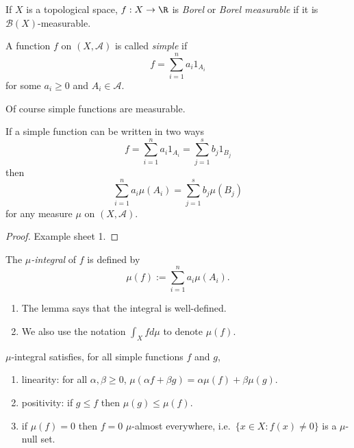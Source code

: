 \documentclass[a4paper]{article}
\begin{document}
\begin{definition}
  If \(X\) is a topological space, \(f: X \to \R\) is \emph{Borel} or \emph{Borel measurable} if it is \(\mathcal B(X)\)-measurable.
\end{definition}

\begin{definition}
  A function \(f\) on \((X, \mathcal A)\) is called \emph{simple} if
  \[
    f = \sum_{i = 1}^n a_i 1_{A_i}
  \]
  for some \(a_i \geq 0\) and \(A_i \in \mathcal A\).
\end{definition}

Of course simple functions are measurable.

\begin{lemma}
  If a simple function can be written in two ways
  \[
    f = \sum_{i = 1}^n a_i 1_{A_i} = \sum_{j = 1}^s b_j 1_{B_j}
  \]
  then
  \[
    \sum_{i = 1}^n a_i \mu(A_i) = \sum_{j = 1}^s b_j \mu(B_j)
  \]
  for any measure \(\mu\) on \((X, \mathcal A)\).
\end{lemma}

\begin{proof}
  Example sheet 1.
\end{proof}

\begin{definition}
  The \emph{\(\mu\)-integral} of \(f\) is defined by
  \[
    \mu(f) := \sum_{i = 1}^n a_i \mu(A_i).
  \]
\end{definition}

\begin{remark}\leavevmode
  \begin{enumerate}
  \item The lemma says that the integral is well-defined.
  \item We also use the notation \(\int_X f d\mu\) to denote \(\mu(f)\).
  \end{enumerate}
\end{remark}

\begin{proposition}
  \(\mu\)-integral satisfies, for all simple functions \(f\) and \(g\),
\begin{enumerate}
\item linearity: for all \(\alpha, \beta \geq 0\), \(\mu(\alpha f + \beta g) = \alpha \mu(f) + \beta \mu(g)\).
\item positivity: if \(g \leq f\) then \(\mu(g) \leq \mu(f)\).
\item if \(\mu(f) = 0\) then \(f = 0\) \(\mu\)-almost everywhere, i.e.\ \(\{x \in X: f(x) \neq 0\}\) is a \(\mu\)-null set.
\end{enumerate}
\end{proposition}
\end{document}

